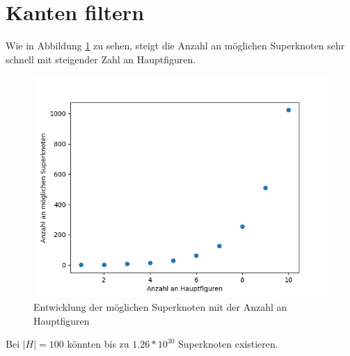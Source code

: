 \section{Kanten filtern}
Wie in Abbildung \ref{fig:superknotenentwicklung} zu sehen, steigt die Anzahl an möglichen Superknoten sehr schnell mit steigender Zahl an Hauptfiguren.
\begin{figure}[h]
	\centering
	\includegraphics[width=0.7\linewidth]{images/Superknotenentwicklung}
	\caption[]{Entwicklung der möglichen Superknoten mit der Anzahl an Hauptfiguren}
	\label{fig:superknotenentwicklung}
\end{figure}
Bei $|H| = 100$ könnten bis zu $1.26*10^{30}$ Superknoten existieren. 







